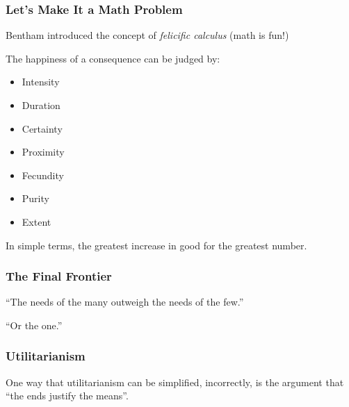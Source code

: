 \begin{frame}
\frametitle{Let's Make It a Math Problem}

Bentham introduced the concept of \textit{felicific calculus} (math is fun!)

The happiness of a consequence can be judged by:

\begin{itemize}
	\item Intensity
	\item Duration
	\item Certainty
	\item Proximity
	\item Fecundity
	\item Purity
	\item Extent
\end{itemize}

In simple terms, the greatest increase in good for the greatest number.

\end{frame}



\begin{frame}
\frametitle{The Final Frontier}

``The needs of the many outweigh the needs of the few.''

``Or the one.''


\end{frame}



\begin{frame}
\frametitle{Utilitarianism}

One way that utilitarianism can be simplified, incorrectly, is the argument that ``the ends justify the means''.


\end{frame}





